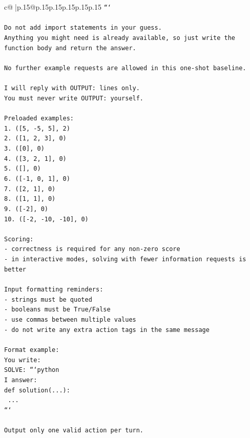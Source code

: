 \documentclass{article}
\begin{document}
{\begin{supertabular}{c@{$\;$}|p{.15\linewidth}@{}p{.15\linewidth}p{.15\linewidth}p{.15\linewidth}p{.15\linewidth}p{.15\linewidth}}
{{{\texttt{```} \\
\\ 
\texttt{Do not add import statements in your guess.} \\
\texttt{Anything you might need is already available, so just write the function body and return the answer.} \\
\\ 
\texttt{No further example requests are allowed in this one{-}shot baseline.} \\
\\ 
\texttt{I will reply with OUTPUT: lines only.} \\
\texttt{You must never write OUTPUT: yourself.} \\
\\ 
\texttt{Preloaded examples:} \\
\texttt{1. ({[}5, {-}5, 5{]}, 2)} \\
\texttt{2. ({[}1, 2, 3{]}, 0)} \\
\texttt{3. ({[}0{]}, 0)} \\
\texttt{4. ({[}3, 2, 1{]}, 0)} \\
\texttt{5. ({[}{]}, 0)} \\
\texttt{6. ({[}{-}1, 0, 1{]}, 0)} \\
\texttt{7. ({[}2, 1{]}, 0)} \\
\texttt{8. ({[}1, 1{]}, 0)} \\
\texttt{9. ({[}{-}2{]}, 0)} \\
\texttt{10. ({[}{-}2, {-}10, {-}10{]}, 0)} \\
\\ 
\texttt{Scoring:} \\
\texttt{{-} correctness is required for any non{-}zero score} \\
\texttt{{-} in interactive modes, solving with fewer information requests is better} \\
\\ 
\texttt{Input formatting reminders:} \\
\texttt{{-} strings must be quoted} \\
\texttt{{-} booleans must be True/False} \\
\texttt{{-} use commas between multiple values} \\
\texttt{{-} do not write any extra action tags in the same message} \\
\\ 
\texttt{Format example:} \\
\texttt{You write:} \\
\texttt{SOLVE: ```python} \\
\texttt{I answer:} \\
\texttt{def solution(...):} \\
\texttt{    ...} \\
\texttt{```} \\
\\ 
\texttt{Output only one valid action per turn.} \\
            }
        }
    }
     \\ \\


\end{supertabular}}
\end{document}
